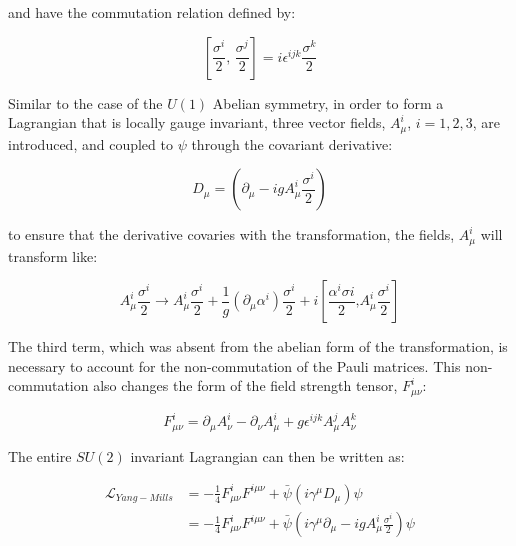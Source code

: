 \noindent and have the commutation relation defined by:

\begin{equation}\label{eq:pauli_matrices_commutator}
\left[\frac{\sigma^{i}}{2}\text{, }\frac{\sigma^{j}}{2}\right] =
i\epsilon^{ijk}\frac{\sigma^{k}}{2}
\end{equation}

\par Similar to the case of the $U(1)$ Abelian symmetry, in order to form
a Lagrangian that is locally gauge invariant, three vector fields,
$A_{\mu}^{i}$, $i=1,2,3$, are introduced, and coupled to $\psi$
through the covariant derivative:

\begin{equation}\label{eq:yang_mills_covariant_derivative}
D_{\mu} = (\partial_{\mu} - igA_{\mu}^{i}\frac{\sigma^{i}}{2})
\end{equation}

\noindent to ensure that the derivative covaries with the
transformation, the fields, $A_{\mu}^{i}$ will transform like:

\begin{equation}\label{eq:yang_mills_vector_field_transformation}
A_{\mu}^{i}\frac{\sigma^{i}}{2} \rightarrow
A_{\mu}^{i}\frac{\sigma^{i}}{2} +
\frac{1}{g}(\partial_{\mu}\alpha^{i})\frac{\sigma
^{i}}{2} +
i\left[\frac{\alpha^{i}\sigma{i}}{2}\text{,
}A_{\mu}^{i}\frac{\sigma^{i}}{2}\right]
\end{equation}

\noindent The third term, which was absent from the abelian form of
the transformation, is necessary to account for the non-commutation of
the Pauli matrices.  This non-commutation also changes the form of
the field strength tensor, $F_{\mu\nu}^{i}$:

\begin{equation}\label{eq:yang_mills_field_strength_tensor}
F_{\mu\nu}^{i} = \partial_{\mu}A_{\nu}^{i} - \partial_{\nu}A_{\mu}^{i} + g\epsilon^{ijk}A_{\mu}^{j}A_{\nu}^{k}
\end{equation}

\noindent The entire $SU(2)$ invariant Lagrangian can then be written
as:

\begin{equation}\label{eq:yang_mills_invariant_lagrangian}
\begin{aligned}
\mathcal{L}_{Yang-Mills} & = -\frac{1}{4}F_{\mu\nu}^{i}F^{i\mu\nu} +
\bar{\psi}(i\gamma^{\mu}D_{\mu})\psi \\
 & = -\frac{1}{4}F_{\mu\nu}^{i}F^{i\mu\nu} +
\bar{\psi}(i\gamma^{\mu}\partial_{\mu} -
igA_{\mu}^{i}\frac{\sigma^{i}}{2})\psi
\end{aligned}
\end{equation}

